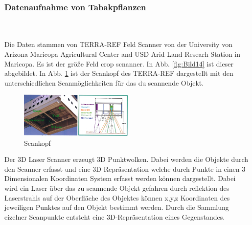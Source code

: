 \documentclass{llncs}
\begin{document}
\subsubsection{Datenaufnahme von Tabakpflanzen}
~\\\\
Die Daten stammen von TERRA-REF Feld Scanner von der University von Arizona Maricopa Agricultural Center and USD Arid Land Researh Station in Maricopa. Es ist der größe Feld crop scnanner. In Abb. \ref{fig:Bild14} ist dieser abgebildet. In Abb. \ref{fig:Bild15} ist der Scankopf des TERRA-REF dargestellt mit den unterschiedlichen Scanmöglichkeiten für das du scannende Objekt. 
 

\begin{figure}[htbp] 
	\centering
	\includegraphics[width=0.5\textwidth]{lematech_2.png}
	\caption{Scankopf}
	\label{fig:Bild15}
\end{figure}

Der 3D Laser Scanner erzeugt 3D Punktwolken. Dabei werden die Objekte durch den Scanner erfasst und eine 3D Repräsentation welche durch Punkte in einen 3 Dimensionalen Koordinaten System erfasst werden können dargestellt. Dabei wird ein Laser über das zu scannende Objekt gefahren durch reflektion des Laserstrahls auf der Oberfläche des Objektes können x,y,z Koordinaten des jeweiligen Punktes auf den Objekt bestimmt werden. Durch die Sammlung eizelner Scanpunkte entsteht eine 3D-Repräsentation eines Gegenstandes. 

\newpage
\end{document}
